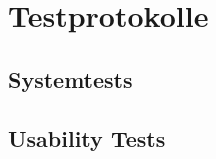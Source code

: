 \chapter{Testprotokolle} \label{appendix:test-protocols}

\section{Systemtests} \label{appendix:system}

\section{Usability Tests} \label{appendix:usability}
